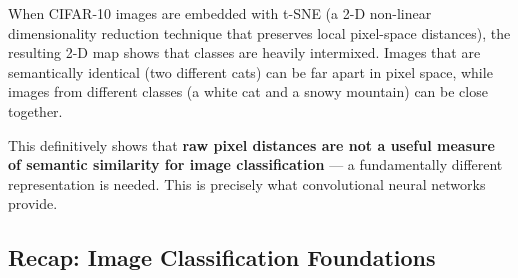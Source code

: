 \documentclass[11pt,a4paper]{article}
\begin{document}
\begin{insightbox}
When CIFAR-10 images are embedded with t-SNE (a 2-D non-linear dimensionality reduction technique
that preserves local pixel-space distances), the resulting 2-D map shows that classes are heavily
intermixed.  Images that are semantically identical (two different cats) can be far apart in pixel
space, while images from different classes (a white cat and a snowy mountain) can be close together.

This definitively shows that \textbf{raw pixel distances are not a useful measure of semantic similarity
for image classification} — a fundamentally different representation is needed.  This is precisely
what convolutional neural networks provide.
\end{insightbox}

\subsection{Recap: Image Classification Foundations}
\label{sec:image_classification_recap}
\end{document}
